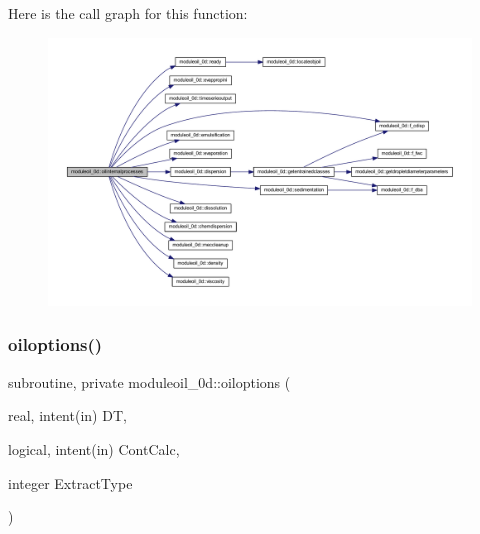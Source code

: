 Here is the call graph for this function\+:\nopagebreak
\begin{figure}[H]
\begin{center}
\leavevmode
\includegraphics[width=350pt]{namespacemoduleoil__0d_acfea99e694d76e1358d2a688a3d50d98_cgraph}
\end{center}
\end{figure}
\mbox{\label{namespacemoduleoil__0d_ae91c560ecac70b4b9f3ba4ca7f14edbe}} 
\subsubsection{\texorpdfstring{oiloptions()}{oiloptions()}}
{\footnotesize\ttfamily subroutine, private moduleoil\+\_\+0d\+::oiloptions (\begin{DoxyParamCaption}\item[{real, intent(in)}]{DT,  }\item[{logical, intent(in)}]{Cont\+Calc,  }\item[{integer}]{Extract\+Type }\end{DoxyParamCaption})\hspace{0.3cm}{\ttfamily [private]}}

